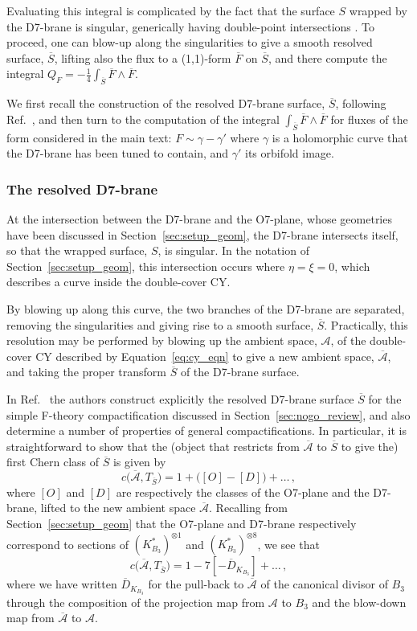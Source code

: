 \documentclass[a4paper,12pt]{article}
\numberwithin{equation}{section}
\newcommand{\w}{\ensuremath{\wedge}}
\newcommand{\mc}{\mathcal}
\newcommand{\be}{\begin{equation}}
\newcommand{\ee}{\end{equation}}
\newcommand{\fthb}{B_3}				%
\newcommand{\canb}[1]{K_{#1}}			%
\newcommand{\candl}{\overline{D}_{K_{B_3}}}	%
\newcommand{\as}{\mc{A}}				%
\newcommand{\asl}{\overline{\mc{A}}}	%
\newcommand{\db}{S}					%
\newcommand{\dbl}{\overline{S}}		%
\newcommand{\crv}{\gamma}			%
\newcommand{\tanb}[1]{T_{#1}}			%
\begin{document}
Evaluating this integral is complicated by the fact that the surface $\db$ wrapped by the D7-brane is singular, generically having double-point intersections \cite{Collinucci:2008pf,Braun_2008}. To proceed, one can blow-up along the singularities to give a smooth resolved surface, $\dbl$, lifting also the flux to a (1,1)-form $\overline{F}$ on $\dbl$, and there compute the integral $Q_F = - \frac{1}{4}\int_{\dbl} \overline{F} \w \overline{F}$.


We first recall the construction of the resolved D7-brane surface, $\dbl$, following Ref.~\cite{Collinucci:2008pf}, and then turn to the computation of the integral $\int_{\dbl} \overline{F} \w \overline{F}$ for fluxes of the form considered in the main text: $F \sim \crv - \crv'$ where $\crv$ is a holomorphic curve that the D7-brane has been tuned to contain, and $\crv'$ its orbifold image.

\subsubsection*{The resolved D7-brane}

At the intersection between the D7-brane and the O7-plane, whose geometries have been discussed in Section~\ref{sec:setup_geom}, the D7-brane intersects itself, so that the wrapped surface, $\db$, is singular. In the notation of Section~\ref{sec:setup_geom}, this intersection occurs where $\eta = \xi = 0$, which describes a curve inside the double-cover CY.

By blowing up along this curve, the two branches of the D7-brane are separated, removing the singularities and giving rise to a smooth surface, $\dbl$. Practically, this resolution may be performed by blowing up the ambient space, $\as$, of the double-cover CY described by Equation~\eqref{eq:cy_eqn} to give a new ambient space, $\asl$, and taking the proper transform $\dbl$ of the D7-brane surface.

In Ref.~\cite{Collinucci:2008pf} the authors construct explicitly the resolved D7-brane surface $\dbl$ for the simple F-theory compactification discussed in Section~\ref{sec:nogo_review}, and also determine a number of properties of general compactifications. In particular, it is straightforward to show that the (object that restricts from $\asl$ to $\dbl$ to give the) first Chern class of $\dbl$ is given by
\be
c\big(\asl,\tanb{\dbl}\big) = 1 + \big([O]-[D]\big) + \ldots \,,
\ee
where $[O]$ and $[D]$ are respectively the classes of the O7-plane and the D7-brane, lifted to the new ambient space $\asl$. Recalling from Section~\ref{sec:setup_geom} that the O7-plane and D7-brane respectively correspond to sections of $(\canb{\fthb}^*)^{\otimes 1}$ and $(\canb{\fthb}^*)^{\otimes 8}$, we see that
\be
c\big(\asl,\tanb{\dbl}\big) = 1  - 7[-\candl] + \ldots \,,
\ee
where we have written $\candl$ for the pull-back to $\asl$ of the canonical divisor of $\fthb$ through the composition of the projection map from $\as$ to $\fthb$ and the blow-down map from $\asl$ to $\as$.
\end{document}
